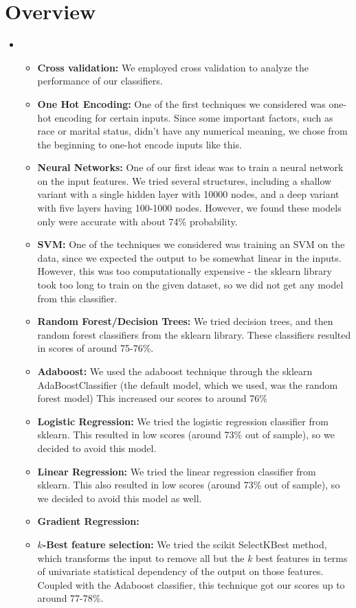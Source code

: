 \section{Overview}
\medskip
\begin{itemize}

    \item {}
    \begin{itemize}
    \item \textbf{Cross validation:} We employed cross validation to analyze the performance of our classifiers.
    \item \textbf{One Hot Encoding:} One of the first techniques we considered was one-hot encoding for certain inputs. Since some important factors, such as race or marital status, didn't have any numerical meaning, we chose from the beginning to one-hot encode inputs like this.
    \item \textbf{Neural Networks:} One of our first ideas was to train a neural network on the input features. We tried several structures, including a shallow variant with a single hidden layer with 10000 nodes, and a deep variant with five layers having 100-1000 nodes. However, we found these models only were accurate with about 74\% probability.
    \item \textbf{SVM:} One of the techniques we considered was training an SVM on the data, since we expected the output to be somewhat linear in the inputs. However, this was too computationally expensive - the sklearn library took too long to train on the given dataset, so we did not get any model from this classifier.
    \item \textbf{Random Forest/Decision Trees:} We tried decision trees, and then random forest classifiers from  the sklearn library. These classifiers resulted in scores of around 75-76\%.
    \item \textbf{Adaboost:} We used the adaboost technique through the sklearn AdaBoostClassifier (the default model, which we used, was the random forest model) This increased our scores to around 76\%
    \item \textbf{Logistic Regression:} We tried the logistic regression classifier from sklearn. This resulted in low scores (around 73\% out of sample), so we decided to avoid this model.
    \item \textbf{Linear Regression:} We tried the linear regression classifier from sklearn. This also resulted in low scores (around 73\% out of sample), so we decided to avoid this model as well.
    \item \textbf{Gradient Regression:} %
    \item \textbf{$k$-Best feature selection:} We tried the scikit SelectKBest method, which transforms the input to remove all but the $k$ best features in terms of univariate statistical dependency of the output on those features. Coupled with the Adaboost classifier, this technique got our scores up to around 77-78\%.



\end{itemize}
\end{itemize}
